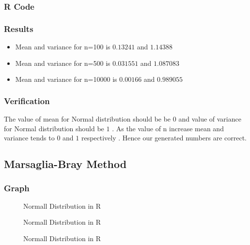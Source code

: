\documentclass[10pt]{article}
\begin{document}
\subsubsection{R Code}



\subsubsection{Results}
\begin{itemize}
\item Mean and variance for n=100 is $0.13241$ and $ 1.14388 $
\item Mean and variance for n=500 is  $0.031551$ and $ 1.087083 $
\item Mean and variance for n=10000 is  $0.00166$ and $ 0.989055 $
\end{itemize}

\subsubsection{Verification}
The value of mean for Normal distribution should be  be $ 0 $ and value of variance  for Normal distribution should be  $ 1 $ . As the value of n increase mean and variance tends to $ 0 $ and $ 1 $ respectively . Hence our generated numbers are correct. 
\pagebreak

\subsection{Marsaglia-Bray Method}
\enlargethispage*{1000pt}
\subsubsection{Graph}
\begin{figure}[H]
		\centering
		\resizebox{0.6\linewidth}{!}{\texttt{[image: q1\_100b]}}
		\caption{Normall Distribution in R}
		\label{fig:q1_f1_a}
\end{figure}
\begin{figure}[H]
		\centering
		\resizebox{0.6\linewidth}{!}{\texttt{[image: q1\_500b]}}
		\caption{Normall Distribution in R}
		\label{fig:q1_f1_a}
\end{figure}
\pagebreak
\begin{figure}[H]
		\centering
		\resizebox{0.6\linewidth}{!}{\texttt{[image: q1\_10000b]}}
		\caption{Normall Distribution in R}
		\label{fig:q1_f1_a}
\end{figure}
\pagebreak
\end{document}
